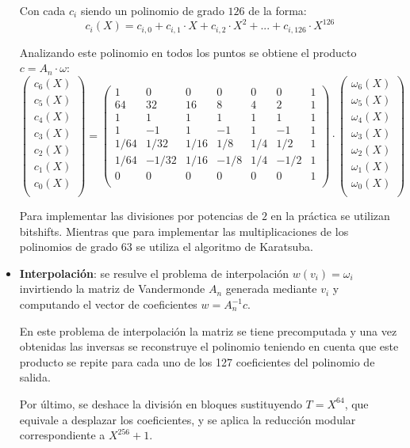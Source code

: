 \begin{itemize}
	Con cada \(c_i\) siendo un polinomio de grado \(126\) de la forma:
	\begin{equation}
		c_i(X)=c_{i,0}+c_{i,1}\cdot X+c_{i,2}\cdot X^2 + ... + c_{i,126}\cdot X^{126}
	\end{equation}
	
	Analizando este polinomio en todos los puntos se obtiene el producto \(c= A_n \cdot \omega\):
	\begin{equation}
		\begin{pmatrix}
			c_6(X)\\
			c_5(X)\\
			c_4(X)\\
			c_3(X)\\
			c_2(X)\\
			c_1(X)\\
			c_0(X)\\
		\end{pmatrix}=
		\begin{pmatrix}
		1 & 0 & 0 &0 &0 &0&1\\
		64 & 32 & 16 &8 &4 &2&1\\
		1&1    &1    &1  & 1 &1 &1\\
		1&  -1  &  1  &-1 &  1&-1 &1\\
		1/64&  1/32  & 1/16   &  1/8& 1/4 &1/2 &1\\
		1/64&  -1/32  & 1/16   &  -1/8& 1/4 &-1/2 &1\\
		0& 0   &    0&  0& 0 &0 &1\\
		\end{pmatrix}\cdot
		\begin{pmatrix}
			\omega_6(X)\\
			\omega_5(X)\\
			\omega_4(X)\\
			\omega_3(X)\\
			\omega_2(X)\\
			\omega_1(X)\\
			\omega_0(X)\\
		\end{pmatrix}
	\end{equation}

	Para implementar las divisiones por potencias de \(2\) en la práctica se utilizan bitshifts. Mientras que para implementar las multiplicaciones de los polinomios de grado 63 se utiliza el algoritmo de Karatsuba.
	\item \textbf{Interpolación}: se resulve el problema de interpolación \(w(v_i)=\omega_i\) invirtiendo la matriz de Vandermonde \(A_n\) generada mediante \(v_i\) y computando el vector de coeficientes \(w=A_n^{-1}c\). 
	\newline
	
	En este problema de interpolación la matriz se tiene precomputada y una vez obtenidas las inversas se reconstruye el polinomio teniendo en cuenta que este producto se repite para cada uno de los 127 coeficientes del polinomio de salida.
	\newline
	
	Por último, se deshace la división en bloques sustituyendo $T=X^{64}$, que equivale a desplazar los coeficientes, y se aplica la reducción modular correspondiente a $X^{256} + 1$.
\end{itemize}
\newpage

